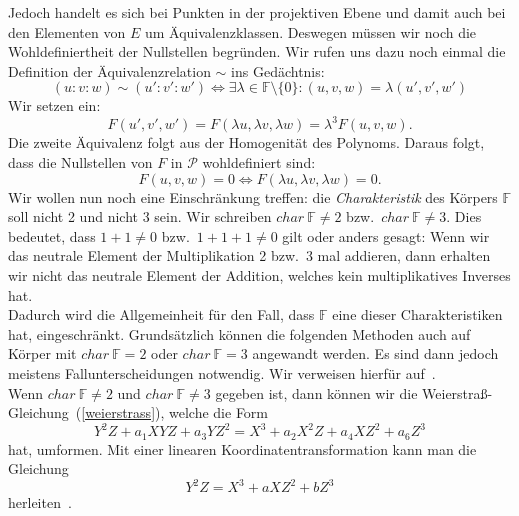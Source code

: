 \documentclass[hidelinks]{article}
\theoremstyle{plain}
\theoremstyle{definition}
\theoremstyle{rem}
\newcommand{\fnz}{\mathbb{F}\setminus\{0\}}
\begin{document}
\begin{sloppypar}
Jedoch handelt es sich bei Punkten in der projektiven Ebene und damit auch bei den Elementen von $E$ um Äquivalenzklassen. Deswegen müssen wir noch die Wohldefiniertheit der Nullstellen begründen. 
Wir rufen uns dazu noch einmal die Definition der Äquivalenzrelation $\sim$ ins Gedächtnis: 
\begin{equation*}
	(u:v:w) \sim (u':v':w') \Leftrightarrow \exists \lambda \in \fnz: (u,v,w) = \lambda (u',v',w')
\end{equation*}
Wir setzen ein:
\begin{equation*}
    F(u',v',w') = F(\lambda u, \lambda v, \lambda w) = \lambda^3 F(u,v,w).
\end{equation*}
Die zweite Äquivalenz folgt aus der Homogenität des Polynoms. Daraus folgt, dass die Nullstellen von $F$ in $\mathcal{P}$ wohldefiniert sind:
\begin{equation*}
    F(u,v,w) = 0 \Leftrightarrow F(\lambda u, \lambda v, \lambda w) = 0.
\end{equation*}
Wir wollen nun noch eine Einschränkung treffen: die \textit{Charakteristik} des Körpers $\mathbb{F}$ soll nicht 2 und nicht 3 sein. Wir schreiben $char \: \mathbb{F} \neq 2$ bzw.\ $char \: \mathbb{F} \neq 3$. 
Dies bedeutet, dass $1 + 1 \neq 0$ bzw.\ $1 + 1 + 1 \neq 0$ gilt oder anders gesagt: Wenn wir das neutrale Element der Multiplikation 2 bzw.\ 3 mal addieren, dann erhalten wir nicht das neutrale Element der Addition, welches kein multiplikatives Inverses hat. \\
Dadurch wird die Allgemeinheit für den Fall, dass $\mathbb{F}$ eine dieser Charakteristiken hat, eingeschränkt. Grundsätzlich können die folgenden Methoden auch auf Körper mit $char \: \mathbb{F}=2$ oder $char \: \mathbb{F}=3$ angewandt werden. Es sind dann jedoch meistens Fallunterscheidungen notwendig. Wir verweisen hierfür auf~\cite[Seite~44]{silverman}.  \\ \newline
Wenn $char \: \mathbb{F} \neq 2$ und $char \: \mathbb{F} \neq 3$ gegeben ist, dann können wir die Weierstraß-Gleichung~(\ref{weierstrass}), welche die Form
\begin{equation*}
    Y^2Z + a_1XYZ + a_3YZ^2 = X^3 + a_2X^2Z + a_4XZ^2 + a_6Z^3
\end{equation*}
hat, umformen. Mit einer linearen Koordinatentransformation kann man die Gleichung
\begin{equation} \label{reduziert-weierstrass}
    Y^2Z = X^3 + aXZ^2 + bZ^3
\end{equation}
herleiten~\cite[Seite~50]{milne2006}.

\end{sloppypar}
\end{document}
